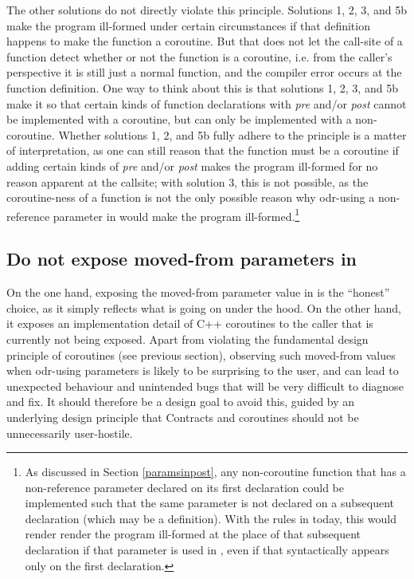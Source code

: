 The other solutions do not directly violate this principle. Solutions 1, 2, 3, and 5b make the program ill-formed under certain circumstances if that definition happens to make the function a coroutine. But that does not let the call-site of a function detect whether or not the function is a coroutine, i.e. from the caller's perspective it is still just a normal function, and the compiler error occurs at the function definition. One way to think about this is that solutions 1, 2, 3, and 5b make it so that certain kinds of function declarations with \emph{pre} and/or \emph{post} cannot be implemented with a coroutine, but can only be implemented with a non-coroutine. Whether solutions 1, 2, and 5b fully adhere to the principle is a matter of interpretation, as one can still reason that the function must be a coroutine if adding certain kinds of \emph{pre} and/or \emph{post} makes the program ill-formed for no reason apparent at the callsite; with solution 3, this is not possible, as the coroutine-ness of a function is not the only possible reason why odr-using a non-reference parameter in  would make the program ill-formed.\footnote{As discussed in Section \ref{paramsinpost}, any non-coroutine function that has a non-reference parameter declared  on its first declaration could be implemented such that the same parameter is not declared  on a subsequent declaration (which may be a definition). With the rules in \cite{P2900R8} today, this would render  render the program ill-formed at the place of that subsequent declaration if that parameter is used in , even if that  syntactically appears only on the first declaration.}

\subsection{Do not expose moved-from parameters in }

On the one hand, exposing the moved-from parameter value in  is the ``honest'' choice, as it simply reflects what is going on under the hood. On the other hand, it exposes an implementation detail of C++ coroutines to the caller that is currently not being exposed. Apart from violating the fundamental design principle of coroutines (see previous section), observing such moved-from values when odr-using  parameters is likely to be surprising to the user, and can lead to unexpected behaviour and unintended bugs that will be very difficult to diagnose and fix. It should therefore be a design goal to avoid this, guided by an underlying design principle that Contracts and coroutines should not be unnecessarily user-hostile.

